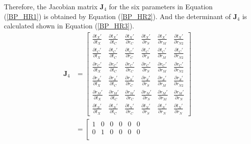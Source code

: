 \documentclass{bmcart}
\begin{document}
\begin{backmatter}
Therefore, the Jacobian matrix ${{\mathbf{J}}_4}$ for the six parameters in Equation (\ref{BP_HR1}) is obtained by Equation (\ref{BP_HR2}). And the determinant of ${{\mathbf{J}}_4}$ is calculated shown in Equation (\ref{BP_HR3}).
\begin{equation}\label{BP_HR2}
\begin{aligned}
{{\mathbf{J}}_4} &= \left[ {\begin{array}{*{20}{c}}
  {\frac{{\partial {t_X}'}}{{\partial {t_X}}}}&{\frac{{\partial {t_X}'}}{{\partial {t_C}}}}&{\frac{{\partial {t_X}'}}{{\partial {r_C}}}}&{\frac{{\partial {t_X}'}}{{\partial {r_S}}}}&{\frac{{\partial {t_X}'}}{{\partial {r_{M}}}}}&{\frac{{\partial {t_X}'}}{{\partial {r_{N2}}}}} \\
  {\frac{{\partial {t_C}'}}{{\partial {t_X}}}}&{\frac{{\partial {t_C}'}}{{\partial {t_C}}}}&{\frac{{\partial {t_C}'}}{{\partial {r_C}}}}&{\frac{{\partial {t_C}'}}{{\partial {r_S}}}}&{\frac{{\partial {t_C}'}}{{\partial {r_{M}}}}}&{\frac{{\partial {t_C}'}}{{\partial {r_{N2}}}}} \\
  {\frac{{\partial {r_C}'}}{{\partial {t_X}}}}&{\frac{{\partial {r_C}'}}{{\partial {t_C}}}}&{\frac{{\partial {r_C}'}}{{\partial {r_C}}}}&{\frac{{\partial {r_C}'}}{{\partial {r_S}}}}&{\frac{{\partial {r_C}'}}{{\partial {r_{M}}}}}&{\frac{{\partial {r_C}'}}{{\partial {r_{N2}}}}} \\
  {\frac{{\partial {r_S}'}}{{\partial {t_X}}}}&{\frac{{\partial {r_S}'}}{{\partial {t_C}}}}&{\frac{{\partial {r_S}'}}{{\partial {r_C}}}}&{\frac{{\partial {r_S}'}}{{\partial {r_S}}}}&{\frac{{\partial {r_S}'}}{{\partial {r_{M}}}}}&{\frac{{\partial {r_S}'}}{{\partial {r_{N2}}}}} \\
  {\frac{{\partial {r_{M}}'}}{{\partial {t_X}}}}&{\frac{{\partial {r_{M}}'}}{{\partial {t_C}}}}&{\frac{{\partial {r_{M}}'}}{{\partial {r_C}}}}&{\frac{{\partial {r_{M}}'}}{{\partial {r_S}}}}&{\frac{{\partial {r_{M}}'}}{{\partial {r_{M}}}}}&{\frac{{\partial {r_{M}}'}}{{\partial {r_{N}}}}} \\
  {\frac{{\partial {t_{N}}'}}{{\partial {t_X}}}}&{\frac{{\partial {t_{N}}'}}{{\partial {t_C}}}}&{\frac{{\partial {t_{N}}'}}{{\partial {r_C}}}}&{\frac{{\partial {t_{N}}'}}{{\partial {r_S}}}}&{\frac{{\partial {t_{N}}'}}{{\partial {r_{N}}}}}&{\frac{{\partial {t_{N}}'}}{{\partial {r_{N}}}}}
\end{array}} \right] \\&= \left[ {\begin{array}{*{20}{c}}
  1&0&0&0&0&0 \\
  0&1&0&0&0&0 \\

\end{array}}
\end{aligned}
\end{equation}
\end{backmatter}
\end{document}
